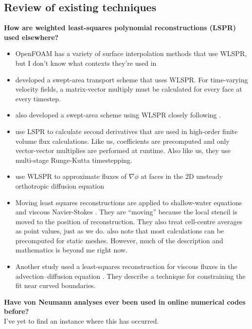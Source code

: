 \documentclass[times]{elsarticle}
\begin{document}
\subsection{Review of existing techniques}

\textbf{How are weighted least-squares polynomial reconstructions (LSPR) used elsewhere?}
\begin{itemize}
	\item OpenFOAM has a variety of surface interpolation methods that use WLSPR, but I don't know what contexts they're used in
	\item \citep{lashley2002} developed a swept-area transport scheme that uses WLSPR.  For time-varying velocity fields, a matrix-vector multiply must be calculated for every face at every timestep.
	\item \citep{skamarock-menchaca2010} also developed a swept-area scheme using WLSPR closely following \citep{lashley2002}.
	\item \citep{skamarock-gassmann2011} use LSPR to calculate second derivatives that are used in high-order finite volume flux calculations.  Like us, coefficients are precomputed and only vector-vector multiplies are performed at runtime.  Also like us, they use multi-stage Runge-Kutta timestepping.
	\item \citep{jayantha-turner2003} use WLSPR to approximate fluxes of $\nabla \phi$ at faces in the 2D unsteady orthotropic diffusion equation
	\item Moving least squares reconstructions are applied to shallow-water equations \citep{cuetofelgueroso2006} and viscous Navier-Stokes \citep{cuetofelgueroso2007}.  They are ``moving'' because the local stencil is moved to the position of reconstruction.  They also treat cell-centre averages as point values, just as we do.
	\citep{cuetofelgueroso2007} also note that most calculations can be precomputed for static meshes.
	However, much of the description and mathematics is beyond me right now.  
	\item Another study used a least-squares reconstruction for viscous fluxes in the advection--diffusion equation \citep{olliviergooch-vanaltena2002}.  They describe a technique for constraining the fit near curved boundaries.
\end{itemize}

\textbf{Have von Neumann analyses ever been used in online numerical codes before?} \\
I've yet to find an instance where this has occurred.
\end{document}
